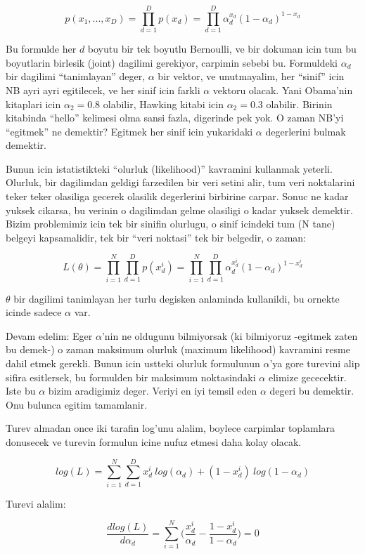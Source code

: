 \documentclass[12pt,fleqn]{article}
\begin{document}
\[ p(x_1,...,x_{D}) = \prod_{d=1}^{D} p(x_d)=\prod_{d=1}^{D}
\alpha_d^{x_d}(1-\alpha_d)^{1-x_d} 
 \]

Bu formulde her $d$ boyutu bir tek boyutlu Bernoulli, ve bir dokuman icin tum bu
boyutlarin birlesik (joint) dagilimi gerekiyor, carpimin sebebi bu. Formuldeki
$\alpha_d$ bir dagilimi ``tanimlayan'' deger, $\alpha$ bir vektor, ve
unutmayalim, her ``sinif'' icin NB ayri ayri egitilecek, ve her sinif icin
farkli $\alpha$ vektoru olacak. Yani Obama'nin kitaplari icin $\alpha_2 = 0.8$
olabilir, Hawking kitabi icin $\alpha_2 = 0.3$ olabilir. Birinin kitabinda
``hello'' kelimesi olma sansi fazla, digerinde pek yok. O zaman NB'yi
``egitmek'' ne demektir? Egitmek her sinif icin yukaridaki $\alpha$ degerlerini
bulmak demektir.

Bunun icin istatistikteki ``olurluk (likelihood)'' kavramini kullanmak
yeterli. Olurluk, bir dagilimdan geldigi farzedilen bir veri setini alir, tum
veri noktalarini teker teker olasiliga gecerek olasilik degerlerini birbirine
carpar. Sonuc ne kadar yuksek cikarsa, bu verinin o dagilimdan gelme olasiligi o
kadar yuksek demektir. Bizim problemimiz icin tek bir sinifin olurlugu, o sinif
icindeki tum (N tane) belgeyi kapsamalidir, tek bir ``veri noktasi'' tek bir
belgedir, o zaman:

\[ L(\theta) = \prod_{i=1}^N \prod_{d=1}^{D} p(x_d^i) = 
\prod_{i=1}^N \prod_{d=1}^{D} \alpha_d^{x_d^i}(1-\alpha_d)^{1-x_d^i}
 \]

$\theta$ bir dagilimi tanimlayan her turlu degisken anlaminda kullanildi, bu
ornekte icinde sadece $\alpha$ var.

Devam edelim: Eger $\alpha$'nin ne oldugunu bilmiyorsak (ki bilmiyoruz -egitmek
zaten bu demek-) o zaman maksimum olurluk (maximum likelihood) kavramini resme
dahil etmek gerekli. Bunun icin ustteki olurluk formulunun $\alpha$'ya gore
turevini alip sifira esitlersek, bu formulden bir maksimum noktasindaki $\alpha$
elimize gececektir. Iste bu $\alpha$ bizim aradigimiz deger. Veriyi en iyi
temsil eden $\alpha$ degeri bu demektir. Onu bulunca egitim tamamlanir.

Turev almadan once iki tarafin log'unu alalim, boylece carpimlar toplamlara
donusecek ve turevin formulun icine nufuz etmesi daha kolay olacak. 

\[ log(L) = \sum_{i=1}^N \sum_{d=1}^{D} {x_d^i}\ log (\alpha_d) + 
(1-x_d^i)\ log (1-\alpha_d) \]

Turevi alalim:

\[ \frac{dlog(L)}{d\alpha_d} = \sum_{i=1}^N \bigg( \frac{x_d^i}{\alpha_d} -
\frac{1-x_d^i}{1-\alpha_d} \bigg) = 0
 \]
\end{document}
